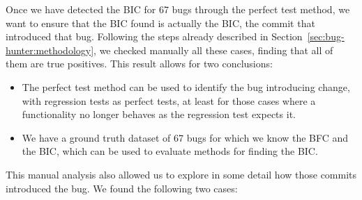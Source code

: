 Once we have detected the BIC for 67 bugs through the perfect test method, we want to ensure that the BIC found is actually the BIC, the commit that introduced that bug. Following the steps already described in Section~\ref{sec:bug-hunter:methodology}, we checked manually all these cases, finding that all of them are true positives. This result allows for two conclusions:
\begin{itemize}
\item The perfect test method can be used to identify the bug introducing change, with regression tests as perfect tests, at least for those cases where a functionality no longer behaves as the regression test expects it.
\item We have a ground truth dataset of 67 bugs for which we know the BFC and the BIC, which can be used to evaluate methods for finding the BIC.
\end{itemize}

This manual analysis also allowed us to explore in some detail how those commits introduced the bug. We found the following two cases:

